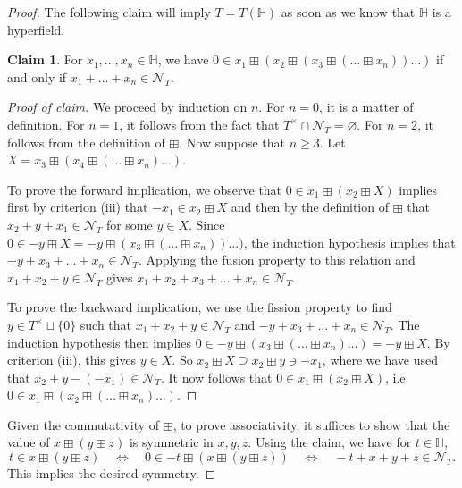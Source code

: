 \documentclass[reqno]{amsart}
\theoremstyle{definition}
\newtheorem*{claim}{Claim}
\theoremstyle{remark}
\begin{document}
\begin{proof}
        The following claim will imply $T = T(\mathbb{H})$ as soon as we know that $\mathbb{H}$ is a hyperfield.
        \begin{claim}
            For $x_1, \dots, x_n \in \mathbb{H}$, we have 
            $0 \in x_1 \boxplus (x_2 \boxplus (x_3 \boxplus (\dots \boxplus x_n))\dots)$ if and only if 
            $x_1 + \dots + x_n \in \mathcal{N}_T$.
        \end{claim}
        \begin{proof}[Proof of claim]
        We proceed by induction on $n$.
        For $n = 0$, it is a matter of definition. For $n = 1$, it follows from the fact that $T^{\times} \cap \mathcal{N}_T = \varnothing$. For $n = 2$, it follows from the definition of $\boxplus$. Now suppose that $n \geq 3$. Let $X = x_3 \boxplus (x_4 \boxplus (\dots \boxplus x_n)\dots)$.

        To prove the forward implication, we observe that 
        $0 \in x_1 \boxplus (x_2 \boxplus X)$ implies first by criterion (iii) that
        $-x_1 \in x_2 \boxplus X$ and then by the definition of $\boxplus$ that $x_2 + y + x_1 \in \mathcal{N}_T$ for some $y \in X$.
        Since $0 \in -y \boxplus X = -y \boxplus (x_3 \boxplus (\dots \boxplus x_n))\dots)$, the induction hypothesis implies that 
        $-y + x_3 + \dots + x_n \in \mathcal{N}_T$. Applying the fusion property to this relation and $x_1 + x_2 + y \in \mathcal{N}_T$ gives $x_1 + x_2 + x_3 + \dots + x_n \in \mathcal{N}_T$.

        To prove the backward implication, we use the fission property to find $y \in T^{\times} \sqcup \{0\}$ such that 
        $x_1 + x_2 + y \in \mathcal{N}_T$ and $-y + x_3 + \dots + x_n \in \mathcal{N}_T$. The induction hypothesis then implies
        $0 \in -y \boxplus (x_3 \boxplus (\dots \boxplus x_n)\dots) = -y \boxplus X$. By criterion (iii), this gives
        $y \in X$. So $x_2 \boxplus X \supseteq x_2 \boxplus y \ni -x_1$, where we have used that 
        $x_2 + y - (-x_1) \in \mathcal{N}_T$.
        It now follows that $0 \in x_1 \boxplus (x_2 \boxplus X)$, i.e.\
        $0 \in x_1 \boxplus (x_2 \boxplus (\dots \boxplus x_n)\dots)$.
        \end{proof}

        Given the commutativity of $\boxplus$, to prove associativity, it suffices to show that the value of
        $x \boxplus (y \boxplus z)$ is symmetric in $x,y,z$. Using the claim, we have for $t \in \mathbb{H}$,
        \[
            t \in x \boxplus (y \boxplus z)
            \quad \iff \quad 
            0 \in -t \boxplus (x \boxplus (y \boxplus z)) \quad \iff\quad  
            -t + x + y + z \in \mathcal{N}_T.
        \]
        This implies the desired symmetry.
    \end{proof}
\end{document}
